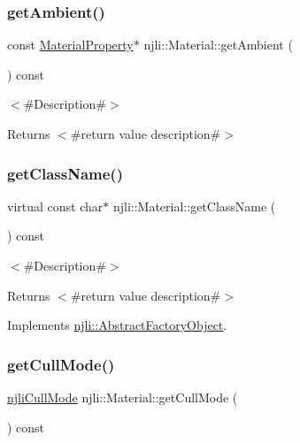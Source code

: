 \subsubsection{\texorpdfstring{get\+Ambient()}{getAmbient()}\hspace{0.1cm}{\footnotesize\ttfamily [2/2]}}
{\footnotesize\ttfamily const \mbox{\hyperlink{classnjli_1_1_material_property}{Material\+Property}}$\ast$ njli\+::\+Material\+::get\+Ambient (\begin{DoxyParamCaption}{ }\end{DoxyParamCaption}) const}

$<$\#\+Description\#$>$

\begin{DoxyReturn}{Returns}
$<$\#return value description\#$>$ 
\end{DoxyReturn}
\mbox{\label{classnjli_1_1_material_aaea36cd9ab4ea05af15a0a260d853d8e}} 
\subsubsection{\texorpdfstring{get\+Class\+Name()}{getClassName()}}
{\footnotesize\ttfamily virtual const char$\ast$ njli\+::\+Material\+::get\+Class\+Name (\begin{DoxyParamCaption}{ }\end{DoxyParamCaption}) const\hspace{0.3cm}{\ttfamily [virtual]}}

$<$\#\+Description\#$>$

\begin{DoxyReturn}{Returns}
$<$\#return value description\#$>$ 
\end{DoxyReturn}


Implements \mbox{\hyperlink{classnjli_1_1_abstract_factory_object_af4151e41b80d5bc3fc42822c67fc2278}{njli\+::\+Abstract\+Factory\+Object}}.

\mbox{\label{classnjli_1_1_material_a0424df07cf4252ede04069be6e8bd56b}} 
\subsubsection{\texorpdfstring{get\+Cull\+Mode()}{getCullMode()}}
{\footnotesize\ttfamily \mbox{\hyperlink{namespacenjli_a2247adafa5de18bc18550918b4ed48d8}{njli\+Cull\+Mode}} njli\+::\+Material\+::get\+Cull\+Mode (\begin{DoxyParamCaption}{ }\end{DoxyParamCaption}) const}

